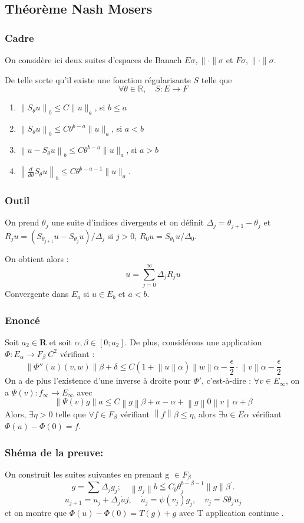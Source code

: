 \documentclass{beamer}
\begin{document}
\subsection*{Théorème Nash Mosers}
\begin{frame}
\frametitle{Cadre}
On considère ici deux suites d'espaces de Banach ${E}\sigma, \lVert \cdot \rVert\sigma$ et ${F}\sigma, \lVert \cdot \rVert\sigma$.

De telle sorte qu'il existe une fonction régularisante $S$ telle que 
\[
\forall \theta \in \mathbb{R}, \quad S : E \to F 
\]

\begin{enumerate}
    \item $\left\|S_\theta u\right\|_b \leq C\|u\|_a$, si $b \leq a$
    \item $\left\|S_\theta u\right\|_b \leq C \theta^{b-a}\|u\|_a$, si $a < b$
    \item $\left\|u-S_\theta u\right\|_b \leq C \theta^{b-a}\|u\|_a$, si $a > b$
    \item $\left\|\frac{d}{d \theta} S_\theta u\right\|_b \leq C \theta^{b-a-1}\|u\|_a$.
\end{enumerate}
\end{frame}

\begin{frame}
\frametitle{Outil}
On prend $\theta_j$ une suite d'indices divergents et on définit $\Delta_j= \theta_{j+1} - \theta_{j}$ et $R_j u=\left(S_{\theta_{j+1}} u-S_{\theta_j} u\right) / \Delta_j$ si $j>0$, $R_0 u=S_{\theta_1} u / \Delta_0$.

On obtient alors :
\[ u=\sum_{j=0}^{\infty} \Delta_j R_j u \]
Convergente dans $E_a$ si $u \in E_b$ et $a < b$.
\end{frame}
\begin{frame}
\frametitle{Enoncé }
Soit $a_2 \in \mathbf{R}$ et soit $\alpha , \beta \in [0;a_2 ]$.
De plus, considérons une application $\Phi : E_\alpha \to F_\beta \: C^2 $ vérifiant :
\[ \left\|\Phi '' (u)(v,w) \right\|{\beta + \delta} \leq C ( 1 +\left\|u \right\|\alpha ) \left\|w \right\|{\alpha - \frac{\epsilon}{2} } \cdot \left\| v \right\|{\alpha - \frac{\epsilon}{2}} \]  
On a de plus l'existence d'une inverse à droite pour $\Phi' $, c'est-à-dire :
$\forall v \in E_\infty$, on a $\Psi (v): f_\infty \to E_\infty $ avec 
\[ \left\| \Psi(v)g \right\|a \leq C \left\| g \right\|{\beta + a - \alpha }+ \left\| g \right\|0 \left\| v \right\|{\alpha + \beta} \]
Alors, $\exists \eta > 0 $ telle que $\forall f \in F_\beta$ vérifiant $ \left\| f \right\|\beta \leq \eta$, alors $\exists u \in E\alpha$ vérifiant $ \Phi(u)-\Phi(0)=f$.
\end{frame}
\begin{frame}
\frametitle{Shéma de la preuve:}
On construit les suites suivantes en prenant g $\in F_\beta$
$$
g=\sum \Delta_j g_j ; \quad\left\|g_j\right\|b \leqq C_b \theta_j^{b-\beta-1}\|g\|\beta^{\prime} .
$$
$$
u_{j+1}=u_j+\Delta_j \dot{u}j, \quad \dot{u}_j=\psi\left(v_j\right) g_j, \quad v_j=S{\theta_j} u_j
$$
et on montre que $\Phi(u) -\Phi(0) = T(g) + g$ avec T application continue . 
\end{frame}
\end{document}
